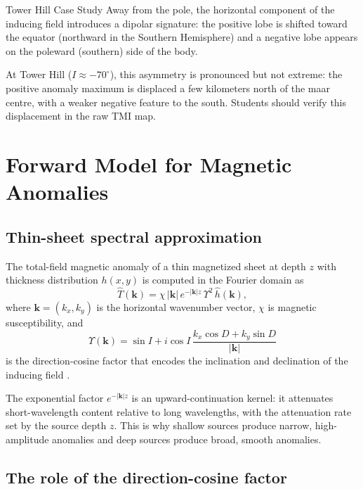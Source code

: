 \begin{activity}{Tower Hill Case Study}
Away from the pole, the horizontal component of the inducing field
introduces a dipolar signature: the positive lobe is shifted toward the
equator (northward in the Southern Hemisphere) and a negative lobe appears
on the poleward (southern) side of the body.

At Tower Hill ($I \approx -70^\circ$), this asymmetry is pronounced but not
extreme: the positive anomaly maximum is displaced a few kilometers
north of the maar centre, with a weaker negative feature to the south.
Students should verify this displacement in the raw TMI map.

\section{Forward Model for Magnetic Anomalies}

\subsection{Thin-sheet spectral approximation}

The total-field magnetic anomaly of a thin magnetized sheet at depth $z$
with thickness distribution $h(x,y)$ is computed in the Fourier domain as
\begin{equation}
\hat{T}(\mathbf{k})
  = \chi\,|\mathbf{k}|\,e^{-|\mathbf{k}|z}\,\Upsilon^2\,\hat{h}(\mathbf{k}),
\end{equation}
where $\mathbf{k} = (k_x, k_y)$ is the horizontal wavenumber vector,
$\chi$ is magnetic susceptibility, and
\begin{equation}
\Upsilon(\mathbf{k})
  = \sin I
    + i\cos I\,
      \frac{k_x\cos D + k_y\sin D}{|\mathbf{k}|}
\end{equation}
is the direction-cosine factor that encodes the inclination and declination
of the inducing field \citep{Blakely1995}.

The exponential factor $e^{-|\mathbf{k}|z}$ is an upward-continuation kernel:
it attenuates short-wavelength content relative to long wavelengths, with
the attenuation rate set by the source depth $z$.
This is why shallow sources produce narrow, high-amplitude anomalies and deep
sources produce broad, smooth anomalies.

\subsection{The role of the direction-cosine factor}


\end{activity}
